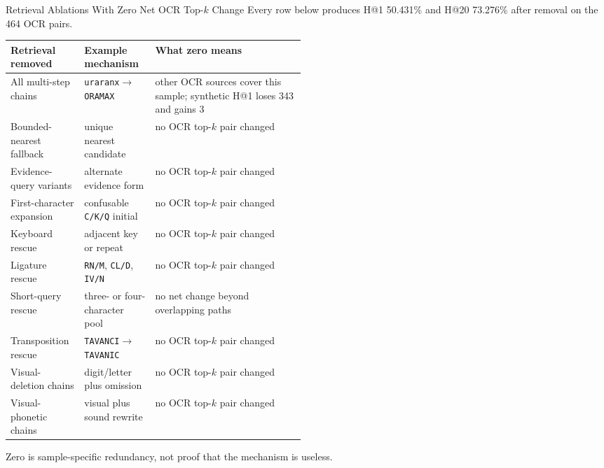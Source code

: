 \documentclass[aspectratio=169,10pt]{beamer}
\newcommand{\code}[1]{\texttt{#1}}
\begin{document}
\begin{frame}{Retrieval Ablations With Zero Net OCR Top-$k$ Change}
\scriptsize
Every row below produces H@1 50.431\% and H@20 73.276\% after removal on the
464 OCR pairs.

\begin{tabularx}{\linewidth}{@{}L{0.25\linewidth}L{0.24\linewidth}Y@{}}
\toprule
\textbf{Retrieval removed} & \textbf{Example mechanism} & \textbf{What zero means} \\
\midrule
All multi-step chains & \code{uraranx}$\rightarrow$\code{ORAMAX} & other OCR sources cover this sample; synthetic H@1 loses 343 and gains 3 \\
Bounded-nearest fallback & unique nearest candidate & no OCR top-$k$ pair changed \\
Evidence-query variants & alternate evidence form & no OCR top-$k$ pair changed \\
First-character expansion & confusable \code{C/K/Q} initial & no OCR top-$k$ pair changed \\
Keyboard rescue & adjacent key or repeat & no OCR top-$k$ pair changed \\
Ligature rescue & \code{RN/M}, \code{CL/D}, \code{IV/N} & no OCR top-$k$ pair changed \\
Short-query rescue & three- or four-character pool & no net change beyond overlapping paths \\
Transposition rescue & \code{TAVANCI}$\rightarrow$\code{TAVANIC} & no OCR top-$k$ pair changed \\
Visual-deletion chains & digit/letter plus omission & no OCR top-$k$ pair changed \\
Visual-phonetic chains & visual plus sound rewrite & no OCR top-$k$ pair changed \\
\bottomrule
\end{tabularx}

Zero is sample-specific redundancy, not proof that the mechanism is useless.
\end{frame}
\end{document}
